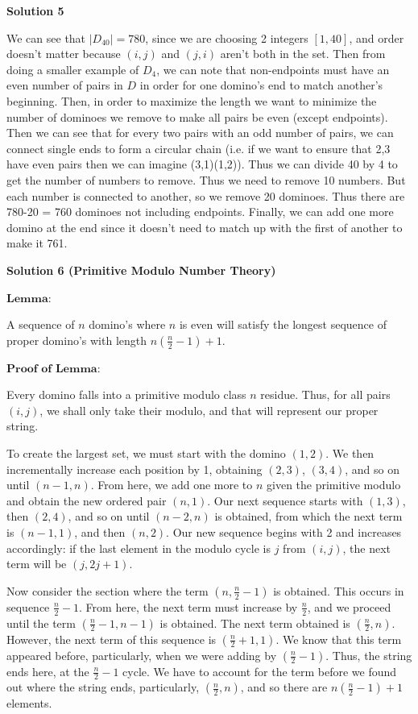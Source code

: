 \begin{enumerate}
 



\textbf{Solution 5}

We can see that $|D_{40}| = 780$, since we are choosing 2 integers $[1,40]$, and order doesn't matter because $(i,j)$ and $(j,i)$ aren't both in the set. Then from doing a smaller example of $D_4$, we can note that non-endpoints must have an even number of pairs in $D$ in order for one domino's end to match another's beginning. Then, in order to maximize the length we want to minimize the number of dominoes we remove to make all pairs be even (except endpoints). Then we can see that for every two pairs with an odd number of pairs, we can connect single ends to form a circular chain (i.e. if we want to ensure that 2,3 have even pairs then we can imagine (3,1)(1,2)). Thus we can divide 40 by 4 to get the number of numbers to remove. Thus we need to remove 10 numbers. But each number is connected to another, so we remove 20 dominoes. Thus there are 780-20 = 760 dominoes not including endpoints. Finally, we can add one more domino at the end since it doesn't need to match up with the first of another to make it 761.

 



\textbf{Solution 6 (Primitive Modulo Number Theory)}

$\textbf{Lemma}$:

 A sequence of $n$ domino's where $n$ is even will satisfy the longest sequence of proper domino's with length $n(\frac{n}{2} -1) + 1$.

 $\textbf{Proof of Lemma}$:

 Every domino falls into a primitive modulo class $n$ residue. Thus, for all pairs $(i,j)$, we shall only take their modulo, and that will represent our proper string. 

 To create the largest set, we must start with the domino $(1,2)$. We then incrementally increase each position by 1, obtaining $(2,3)$, $(3,4)$, and so on until $(n-1,n)$. From here, we add one more to $n$ given the primitive modulo and obtain the new ordered pair $(n,1)$. Our next sequence starts with $(1,3)$, then $(2,4)$, and so on until $(n-2, n)$ is obtained, from which the next term is $(n-1, 1)$, and then $(n,2)$. Our new sequence begins with 2 and increases accordingly: if the last element in the modulo cycle is $j$ from $(i,j)$, the next term will be $(j, 2j+1)$. 

 Now consider the section where the term $(n, \frac{n}{2} - 1)$ is obtained. This occurs in sequence $\frac{n}{2} - 1$. From here, the next term must increase by $\frac{n}{2}$, and we proceed until the term $(\frac{n}{2} - 1, n - 1)$ is obtained. The next term obtained is $(\frac{n}{2}, n)$. However, the next term of this sequence is $(\frac{n}{2} + 1, 1)$. We know that this term appeared before, particularly, when we were adding by $(\frac{n}{2}-1)$. Thus, the string ends here, at the $\frac{n}{2} - 1$ cycle. We have to account for the term before we found out where the string ends, particularly, $(\frac{n}{2}, n)$, and so there are $n(\frac{n}{2} -1) + 1$ elements.


\end{enumerate}
